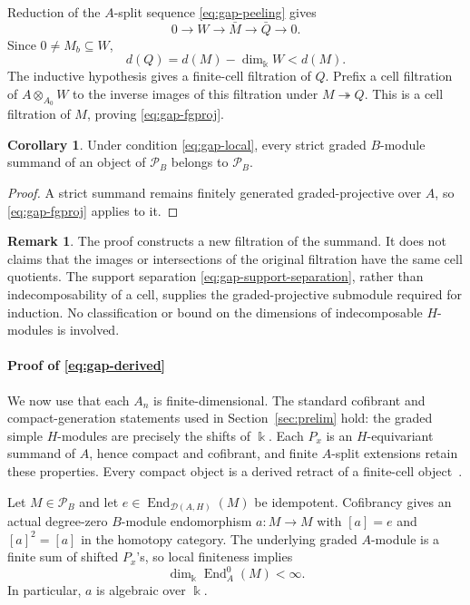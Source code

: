 \documentclass[11pt]{article}
\theoremstyle{definition}
\newtheorem{cor}[thm]{Corollary}
\newtheorem{rem}[thm]{Remark}
\numberwithin{equation}{section}
\newcommand{\kk}{\Bbbk}
\newcommand{\Pun}{\mathcal{P}_B}
\newcommand{\End}{\operatorname{End}}
\newcommand{\Der}{\mathcal{D}}
\begin{document}
Reduction of the $A$-split sequence \eqref{eq:gap-peeling} gives
\[
 0\longrightarrow W\longrightarrow\bar M
 \longrightarrow\bar Q\longrightarrow0.
\]
Since $0\ne M_b\subseteq W$,
\[
 d(Q)=d(M)-\dim_\kk W<d(M).
\]
The inductive hypothesis gives a finite-cell filtration of $Q$.
Prefix a cell filtration of $A\otimes_{A_0}W$ to the inverse images of
this filtration under $M\twoheadrightarrow Q$.  This is a cell
filtration of $M$, proving \eqref{eq:gap-fgproj}.


\begin{cor}\label{cor:gap-strict}
Under condition \eqref{eq:gap-local}, every strict
graded $B$-module summand of an object of $\Pun$ belongs to $\Pun$.
\end{cor}
\begin{proof}
A strict summand remains finitely generated graded-projective over $A$,
so \eqref{eq:gap-fgproj} applies to it.
\end{proof}

\begin{rem}\label{rem:gap-new-filtration}
The proof constructs a new filtration of the summand.  It does not claims
that the images or intersections of the original filtration have the
same cell quotients.  The support separation
\eqref{eq:gap-support-separation}, rather than indecomposability of a
cell, supplies the graded-projective submodule required for induction.
No classification or bound on the dimensions of indecomposable
$H$-modules is involved.
\end{rem}

\paragraph{Proof of \eqref{eq:gap-derived}}
We now use that each $A_n$ is finite-dimensional.  The standard
cofibrant and compact-generation statements used in
Section~\ref{sec:prelim} hold: the graded
simple $H$-modules are precisely the shifts of $\kk$.
Each $P_x$ is an $H$-equivariant summand of $A$, hence compact and
cofibrant, and finite $A$-split extensions retain these properties.
Every compact object is a derived retract of a finite-cell
object~\cite[Corollaries~6.8, 6.10 and~7.15]{QYHopf}.


Let $M\in\Pun$ and let $e\in\End_{\Der(A,H)}(M)$ be idempotent.
Cofibrancy gives an actual degree-zero $B$-module endomorphism
$a:M\to M$ with $[a]=e$ and $[a]^2=[a]$ in the homotopy category.
The underlying graded $A$-module is a finite sum of shifted $P_x$'s,
so local finiteness implies
\[
 \dim_\kk\End_A^0(M)<\infty.
\]
In particular, $a$ is algebraic over $\kk$.
\end{document}

